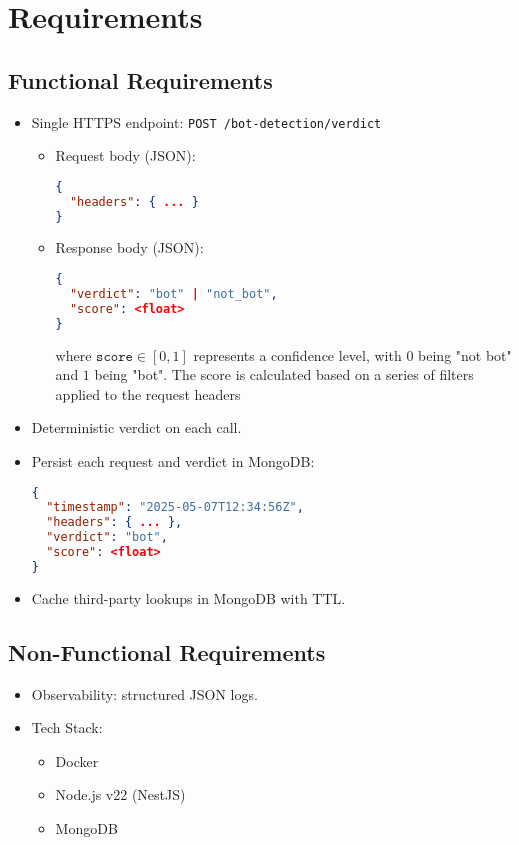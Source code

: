 \documentclass[12pt,a4paper]{article}
\begin{document}
\newpage 
\section{Requirements}

\subsection{Functional Requirements}
\begin{itemize}
  \item Single HTTPS endpoint: \lstinline|POST /bot-detection/verdict|  
    \begin{itemize}
      \item Request body (JSON):
        \begin{lstlisting}[language=json,frame=none]
{
  "headers": { ... }
}
        \end{lstlisting}
      \item Response body (JSON):
        \begin{lstlisting}[language=json,frame=none]
{
  "verdict": "bot" | "not_bot",
  "score": <float>
}
        \end{lstlisting}
         where \(\texttt{score} \in [0,1]\) represents a confidence level, with \(0\) being "not bot" and \(1\) being "bot". The score is calculated based on a series of filters applied to the request headers
    \end{itemize}
  \item Deterministic verdict on each call.
  \item Persist each request and verdict in MongoDB:
    \begin{lstlisting}[language=json,frame=none]
{
  "timestamp": "2025-05-07T12:34:56Z",
  "headers": { ... },
  "verdict": "bot",
  "score": <float>
}
    \end{lstlisting}
  \item Cache third-party lookups in MongoDB with TTL.
\end{itemize}

\subsection{Non-Functional Requirements}
\begin{itemize}
  \item Observability: structured JSON logs.
  \item Tech Stack:
    \begin{itemize}
      \item Docker
      \item Node.js v22 (NestJS)
      \item MongoDB
    \end{itemize}
\end{itemize}
\end{document}
